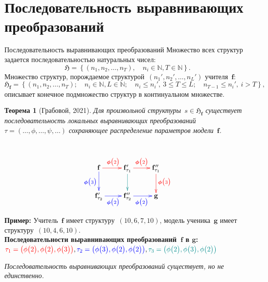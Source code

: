 \documentclass[10pt,pdf,hyperref={unicode}]{beamer}
\newtheorem{rustheorem}{Теорема}
\begin{document}
\section{Последовательность выравнивающих преобразований}
\begin{frame}{Последовательность выравнивающих преобразований}
\justifying
Множество всех структур задается последовательностью натуральных чисел:
\[
\mathfrak{H} = \left\{(n_1, n_2, \ldots, n_{T}), \quad n_i \in \mathbb{N}, T \in \mathbb{N}\right\}.
\]
Множество структур, порождаемое структурой~$(n_{1}', n_{2}', \ldots, n_{L}')$ учителя~$\mathbf{f}$:
\[
\mathfrak{H}_{\mathbf{f}} = \left\{\left(n_1, n_2, \ldots, n_{T}\right); \quad n_i \in \mathbb{N}, L \in \mathbb{N}; \quad n_i \leq n_{i}',~3\leq T\leq L; \quad n_{T-1} \leq n_{i}',~i > T\right\},
\]
описывает конечное подмножество структур в континуальном множестве.

\begin{minipage}[t]{.65\textwidth}

\begin{rustheorem}[Грабовой, 2021]
\justifying
Для произвольной структуры~$s \in \mathfrak{H}_{\mathbf{f}}$ существует последовательность локальных выравнивающих преобразований $\tau = (\ldots, \phi, \ldots, \psi, \ldots)$ сохраняющее распределение параметров модели~$\mathbf{f}$.
\end{rustheorem}

\end{minipage}%
\begin{minipage}[t]{.34\textwidth}

~\\[-2mm]
\begin{equation*}
\xymatrix{
\mathbf{f}\ar@[blue][d]_{\color{blue}\bm{\phi}\bigr(3\bigr)}\ar@[red][r]^{\color{red}\bm{\phi}\bigr(2\bigr)}
& 
\mathbf{f}_{\tau_1}'\ar@[darkcyan][d]\ar@[red][r]^{\color{red}\bm{\phi}\bigr(2\bigr)}
&
\mathbf{f}_{\tau_1}''\ar@[red][d]^{\color{red}\bm{\phi}\bigr(3\bigr)}
\\
\mathbf{f}_{\tau_2}'\ar@[blue][r]_{\color{blue}\bm{\phi}\bigr(2\bigr)}
& 
\mathbf{f}_{\tau_2}''\ar@[blue][r]_{\color{blue}\bm{\phi}\bigr(2\bigr)}
&
\mathbf{g}
}
\end{equation*}

\end{minipage}

\textbf{Пример:} Учитель~$\mathbf{f}$ имеет структуру~$(10, 6, 7, 10)$, модель ученика~$\mathbf{g}$ имеет структуру~$(10,4,6,10)$.\\
\textbf{Последовательности выравнивающих преобразований~$\mathbf{f}$ в $\mathbf{g}$:}\\
${\color{red}\tau_1=\left(\phi\bigr(2\bigr), \phi\bigr(2\bigr), \phi\bigr(3\bigr)\right)}, {\color{blue}\tau_2=\left(\phi\bigr(3\bigr), \phi\bigr(2\bigr), \phi\bigr(2\bigr)\right)}, {\color{darkcyan}\tau_3=\left(\phi\bigr(2\bigr), \phi\bigr(3\bigr), \phi\bigr(2\bigr)\right)}$


{\it Последовательность выравнивающих преобразований существует, но не единственно.}
\end{frame}
\end{document}
